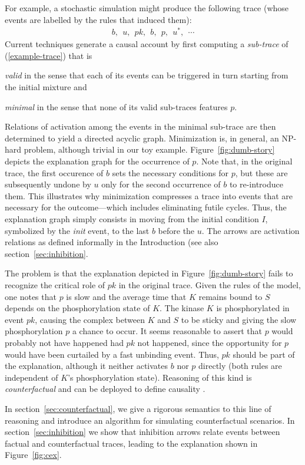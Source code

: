For example, a stochastic simulation might produce the following trace (whose events are labelled by the rules that induced them):
\begin{align}
\label{example-trace} b,\ \ u,\ \ pk,\ \ b,\ \ p,\ \
  u^{*},\ \ \cdots
\end{align} 
Current techniques\cite{DBLP:conf/fsttcs/DanosFFHH12,DanosEtAl-CONCUR07} generate a causal account by first computing
a \emph{sub-trace} of (\ref{example-trace}) that is 
\begin{inparaenum}[(i)]
\item \emph{valid} in the sense that each of its events can be
  triggered in turn starting from the initial mixture and
\item \emph{minimal} in the sense that none of its valid
  sub-traces features $p$.
\end{inparaenum}
Relations of activation among the events in the minimal sub-trace are then determined to yield a directed acyclic graph. Minimization is, in general, an NP-hard problem, although trivial in our toy example. Figure~\ref{fig:dumb-story} depicts the explanation graph for the occurrence of $p$. Note that, in the original trace, the first occurence of $b$ sets the necessary conditions for $p$, but these are subsequently undone by $u$ only for the second occurrence of $b$ to re-introduce them. This illustrates why minimization compresses a trace into events that are necessary for the outcome---which includes eliminating futile cycles. Thus, the explanation graph simply consists in moving from the initial condition $I$, symbolized by the \emph{init} event, to the last $b$ before the $u$. The arrows are activation relations as defined informally in the Introduction (see also section~\ref{sec:inhibition}.



The problem is that the explanation depicted in Figure~\ref{fig:dumb-story} fails to recognize the critical role of $pk$ in the original trace. Given the rules of the model, one notes that $p$ is slow and the average time that $K$ remains bound to $S$ depends on the phosphorylation state of $K$. The kinase $K$ is phosphorylated in event $pk$, causing the complex between $K$ and $S$ to be sticky and giving the slow phosphorylation $p$ a chance to occur. It seems reasonable to assert that $p$ would probably not have happened had $pk$ not happened, since the opportunity for $p$ would have been curtailed by a fast unbinding event. Thus, $pk$ should be part of the explanation, although it neither activates $b$ nor $p$ directly (both rules are independent of $K$'s phosphorylation state). Reasoning of this kind is \emph{counterfactual} and can be deployed to define causality \cite{lewis1974causation,pearl2009causality}.

In section~\ref{sec:counterfactual}, we give a rigorous semantics to this line of reasoning and introduce an algorithm for simulating counterfactual scenarios. In section~\ref{sec:inhibition} we show that inhibition arrows relate events between factual and counterfactual traces, leading to the explanation shown in Figure~\ref{fig:cex}.
